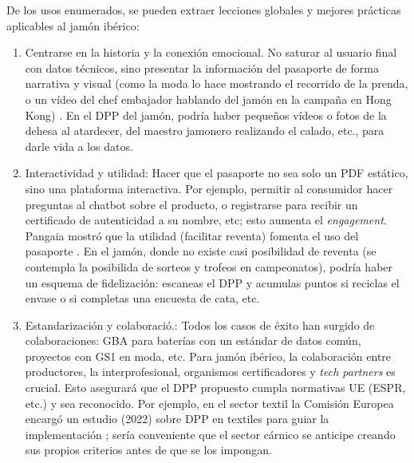 De los usos enumerados, se pueden extraer lecciones globales y  mejores prácticas aplicables al jamón ibérico:
\begin{enumerate}
	\item Centrarse en la historia y la conexión emocional. No saturar al usuario final con datos técnicos, sino presentar la información del pasaporte de forma narrativa y visual (como la moda lo hace mostrando el recorrido de la prenda, o un vídeo del chef embajador hablando del jamón en la campaña en Hong Kong) \cite{depares_china_2024}. En el DPP del jamón, podría haber pequeños vídeos o fotos de la dehesa al atardecer, del maestro jamonero realizando el calado, etc., para darle vida a los datos.
    \item Interactividad y utilidad: Hacer que el pasaporte no sea solo un PDF estático, sino una plataforma interactiva. Por ejemplo, permitir al consumidor hacer preguntas al chatbot sobre el producto, o registrarse para recibir un certificado de autenticidad a su nombre, etc; esto aumenta el \textit{engagement}. Pangaia mostró que la utilidad (facilitar reventa) fomenta el uso del pasaporte \cite{noauthor_10_nodate-1}. En el jamón, donde no existe casi posibilidad de reventa (se contempla la posibilida de sorteos y trofeos en campeonatos), podría haber un esquema de fidelización: escaneas el DPP y acumulas puntos si reciclas el envase o si completas una encuesta de cata, etc.
    \item Estandarización y colaboració.: Todos los casos de éxito han surgido de colaboraciones: GBA para baterías con un estándar de datos común, proyectos con GS1 en moda, etc. Para jamón ibérico, la colaboración entre productores, la interprofesional, organismos certificadores y \textit{tech partners} es crucial. Esto asegurará que el DPP propuesto cumpla normativas UE (ESPR, etc.) y sea reconocido. Por ejemplo, en el sector textil la Comisión Europea encargó un estudio (2022) sobre DPP en textiles para guiar la implementación \cite{european_parliament_directorate_general_for_parliamentary_research_services_digital_2024-1}; sería conveniente que el sector cárnico se anticipe creando sus propios criterios antes de que se los impongan.

\end{enumerate}
